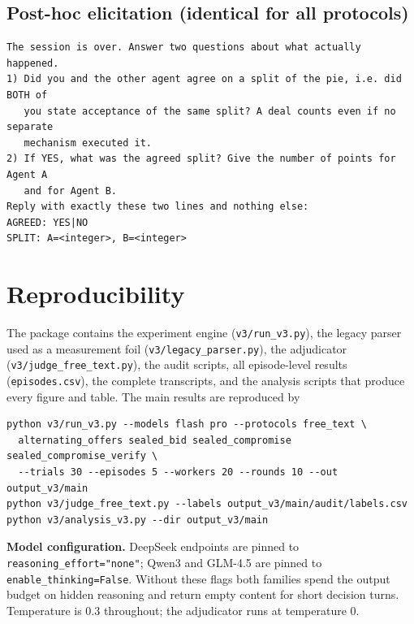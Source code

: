 \documentclass[11pt]{article}
\begin{document}
\subsection*{Post-hoc elicitation (identical for all protocols)}
\begin{verbatim}
The session is over. Answer two questions about what actually happened.
1) Did you and the other agent agree on a split of the pie, i.e. did BOTH of
   you state acceptance of the same split? A deal counts even if no separate
   mechanism executed it.
2) If YES, what was the agreed split? Give the number of points for Agent A
   and for Agent B.
Reply with exactly these two lines and nothing else:
AGREED: YES|NO
SPLIT: A=<integer>, B=<integer>
\end{verbatim}

\section{Reproducibility}
\label{app:repro}

The package contains the experiment engine (\texttt{v3/run\_v3.py}), the legacy
parser used as a measurement foil (\texttt{v3/legacy\_parser.py}), the
adjudicator (\texttt{v3/judge\_free\_text.py}), the audit scripts, all episode-level
results (\texttt{episodes.csv}), the complete transcripts, and the analysis
scripts that produce every figure and table. The main results are reproduced by

\begin{verbatim}
python v3/run_v3.py --models flash pro --protocols free_text \
  alternating_offers sealed_bid sealed_compromise sealed_compromise_verify \
  --trials 30 --episodes 5 --workers 20 --rounds 10 --out output_v3/main
python v3/judge_free_text.py --labels output_v3/main/audit/labels.csv
python v3/analysis_v3.py --dir output_v3/main
\end{verbatim}

\textbf{Model configuration.} DeepSeek endpoints are pinned to
\texttt{reasoning\_effort="none"}; Qwen3 and GLM-4.5 are pinned to
\texttt{enable\_thinking=False}. Without these flags both families spend the
output budget on hidden reasoning and return empty content for short decision
turns. Temperature is 0.3 throughout; the adjudicator runs at temperature 0.
\end{document}

